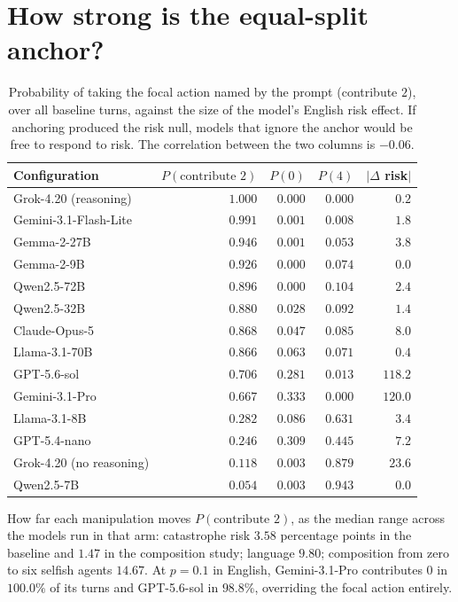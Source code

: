 \documentclass[11pt,a4paper]{article}
\begin{document}
\section{How strong is the equal-split anchor?}
\label{sec:anchor}

\begin{table}[h]
\centering
\caption{Probability of taking the focal action named by the prompt (contribute $2$),
over all baseline turns, against the size of the model's English risk effect. If
anchoring produced the risk null, models that ignore the anchor would be free to
respond to risk. The correlation between the two columns is $-0.06$.}
\begin{tabular}{@{}lrrrr@{}}
\toprule
Configuration & $P(\text{contribute }2)$ & $P(0)$ & $P(4)$ & $|\Delta$ risk$|$ \\
\midrule
Grok-4.20 (reasoning)    & $1.000$ & $0.000$ & $0.000$ & $0.2$ \\
Gemini-3.1-Flash-Lite    & $0.991$ & $0.001$ & $0.008$ & $1.8$ \\
Gemma-2-27B              & $0.946$ & $0.001$ & $0.053$ & $3.8$ \\
Gemma-2-9B               & $0.926$ & $0.000$ & $0.074$ & $0.0$ \\
Qwen2.5-72B              & $0.896$ & $0.000$ & $0.104$ & $2.4$ \\
Qwen2.5-32B              & $0.880$ & $0.028$ & $0.092$ & $1.4$ \\
Claude-Opus-5            & $0.868$ & $0.047$ & $0.085$ & $8.0$ \\
Llama-3.1-70B            & $0.866$ & $0.063$ & $0.071$ & $0.4$ \\
GPT-5.6-sol              & $0.706$ & $0.281$ & $0.013$ & $118.2$ \\
Gemini-3.1-Pro           & $0.667$ & $0.333$ & $0.000$ & $120.0$ \\
Llama-3.1-8B             & $0.282$ & $0.086$ & $0.631$ & $3.4$ \\
GPT-5.4-nano             & $0.246$ & $0.309$ & $0.445$ & $7.2$ \\
Grok-4.20 (no reasoning) & $0.118$ & $0.003$ & $0.879$ & $23.6$ \\
Qwen2.5-7B               & $0.054$ & $0.003$ & $0.943$ & $0.0$ \\
\bottomrule
\end{tabular}
\end{table}

\noindent How far each manipulation moves $P(\text{contribute }2)$, as the median range
across the models run in that arm: catastrophe risk $3.58$ percentage points in the
baseline and $1.47$ in the composition study; language $9.80$; composition from zero to
six selfish agents $14.67$. At $p=0.1$ in English, Gemini-3.1-Pro contributes $0$ in
$100.0\%$ of its turns and GPT-5.6-sol in $98.8\%$, overriding the focal action
entirely.
\end{document}
